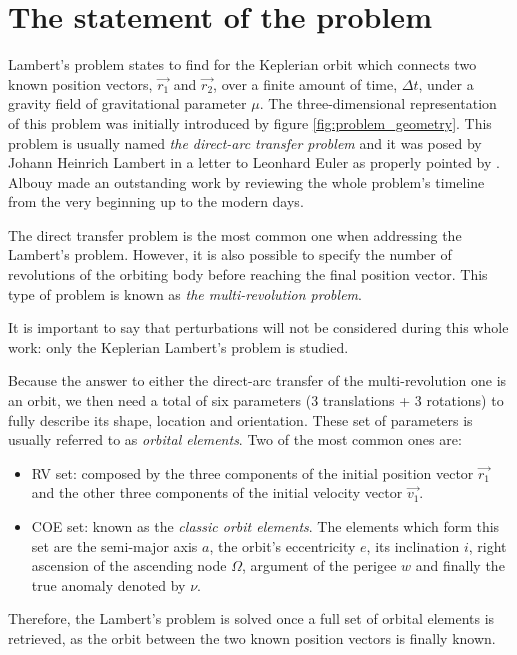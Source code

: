 \section{The statement of the problem}
\label{sec:statement}

Lambert's problem states to find for the Keplerian orbit which connects two
known position vectors, $\vec{r_{1}}$ and $\vec{r_{2}}$, over a finite amount of
time, $\Delta t$, under a gravity field of gravitational parameter $\mu$. The
three-dimensional representation of this problem was initially introduced by
figure \ref{fig:problem_geometry}. This problem is usually named \textit{the
direct-arc transfer problem} and it was posed by Johann Heinrich Lambert in a
letter to Leonhard Euler as properly pointed by \cite{albouy2019}. Albouy made
an outstanding work by reviewing the whole problem's timeline from the very
beginning up to the modern days.

The direct transfer problem is the most common one when addressing the Lambert's
problem. However, it is also possible to specify the number of revolutions of
the orbiting body before reaching the final position vector. This type of
problem is known as \textit{the multi-revolution problem}.

It is important to say that perturbations will not be considered during this
whole work: only the Keplerian Lambert's problem is studied.

Because the answer to either the direct-arc transfer of the multi-revolution one
is an orbit, we then need a total of six parameters (3 translations + 3
rotations) to fully describe its shape, location and orientation. These set of
parameters is usually referred to as \textit{orbital elements}. Two of the most
common ones are:

\begin{itemize}
  \item RV set: composed by the three components of the initial position
        vector $\vec{r_{1}}$ and the other three components of the
        initial velocity vector $\vec{v_{1}}$.
  \item COE set: known as the \textit{classic orbit elements}. The
        elements which form this set are the semi-major axis $a$, the
        orbit's eccentricity $e$, its inclination $i$, right ascension
        of the ascending node $\Omega$, argument of the perigee $w$ and
        finally the true anomaly denoted by $\nu$.
\end{itemize}

Therefore, the Lambert's problem is solved once a full set of orbital elements
is retrieved, as the orbit between the two known position vectors is finally
known.
